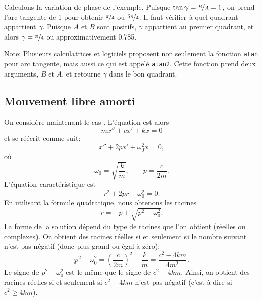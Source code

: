 Calculons la variation de phase de l'exemple.
Puisque $\tan \gamma = \nicefrac{B}{A} = 1$, on prend l'arc tangente de 1 pour obtenir 
$\nicefrac{\pi}{4}$ ou $\nicefrac{5\pi}{4}$. 
Il faut vérifier à quel quadrant appartient $\gamma$.
Puisque  $A$ et $B$ sont positifs, $\gamma$ appartient au premier quadrant, et alors $\gamma =
\nicefrac{\pi}{4}$ ou approximativement 0.785.

Note: Plusieurs calculatrices et logiciels proposent non seulement la fonction 
\texttt{atan} pour arc tangente, mais aussi ce qui est appelé  \texttt{atan2}.
Cette fonction prend deux arguments, $B$ et $A$, et retourne $\gamma$ dans le bon quadrant.



\subsection{Mouvement libre amorti}


On considère maintenant le cas .  L'équation est alors 
\begin{equation*}
	m x'' + c x' + kx = 0
\end{equation*}
et se réécrit comme suit: 
\begin{equation*}
	x'' + 2p x' + \omega_0^2 x = 0,
\end{equation*}
où
\begin{equation*}
	\omega_0 = \sqrt{\frac{k}{m}}, \qquad p = \frac{c}{2m}.
\end{equation*}
L'équation caractéristique est
\begin{equation*}
	r^2 + 2 pr + \omega_0^2 = 0 .
\end{equation*}
En utilisant la formule quadratique, nous obtenons les racines 
\begin{equation*}
	r = -p \pm \sqrt{p^2 - \omega_0^2} .
\end{equation*}
La forme de la solution dépend du type de racines que l'on obtient (réelles ou complexes). 
On obtient des racines réelles si et seulement si le nombre suivant n'est pas négatif (donc plus grand ou égal à zéro): 
\begin{equation*}
	p^2 - \omega_0^2 = {\left( \frac{c}{2m} \right)}^2 - \frac{k}{m}
					 = \frac{c^2 - 4km}{4m^2} .
\end{equation*}
Le signe de $p^2-\omega_0^2$ est le même que le signe de $c^2 - 4km$.  
Ainsi, on obtient des racines réelles si et seulement si  $c^2-4km$ n'est pas négatif (c'est-à-dire si $c^2 \geq 4km$).



